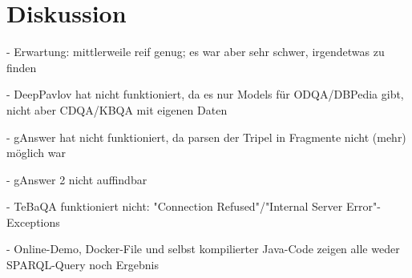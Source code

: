 \chapter{Diskussion}\label{ch:discussion}
- Erwartung: mittlerweile reif genug; es war aber sehr schwer, irgendetwas zu finden

- DeepPavlov hat nicht funktioniert, da es nur Models für ODQA/DBPedia gibt, nicht aber CDQA/KBQA mit eigenen Daten

- gAnswer hat nicht funktioniert, da parsen der Tripel in Fragmente nicht (mehr) möglich war

- gAnswer 2 nicht auffindbar

- TeBaQA funktioniert nicht: "Connection Refused"/"Internal Server Error"-Exceptions

- Online-Demo, Docker-File und selbst kompilierter Java-Code zeigen alle weder SPARQL-Query noch Ergebnis

